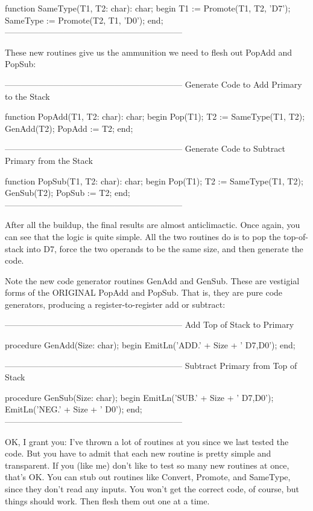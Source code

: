 \documentclass[float=false, crop=false]{standalone}
\begin{document}
function SameType(T1, T2: char): char;
begin
   T1 := Promote(T1, T2, 'D7');
   SameType := Promote(T2, T1, 'D0');
end;
{---------------------------------------------------------------}


These new routines give us the ammunition we need to flesh out PopAdd and
PopSub:


{---------------------------------------------------------------}
{ Generate Code to Add Primary to the Stack }

function PopAdd(T1, T2: char): char;
begin
   Pop(T1);
   T2 := SameType(T1, T2);
   GenAdd(T2);
   PopAdd := T2;
end;


{---------------------------------------------------------------}
{ Generate Code to Subtract Primary from the Stack }

function PopSub(T1, T2: char): char;
begin
   Pop(T1);
   T2 := SameType(T1, T2);
   GenSub(T2);
   PopSub := T2;
end;
{---------------------------------------------------------------}


After all the buildup, the final results are almost anticlimactic. Once again,
you can see that the logic is quite simple. All the two routines do is to pop
the top-of-stack into D7, force the two operands to be the same size, and then
generate the code.

Note the new code generator routines GenAdd and GenSub. These are vestigial
forms of the ORIGINAL PopAdd and PopSub. That is, they are pure code generators,
producing a register-to-register add or subtract:


{---------------------------------------------------------------}
{ Add Top of Stack to Primary }

procedure GenAdd(Size: char);
begin
   EmitLn('ADD.' + Size + ' D7,D0');
end;


{---------------------------------------------------------------}
{ Subtract Primary from Top of Stack }

procedure GenSub(Size: char);
begin
   EmitLn('SUB.' + Size + ' D7,D0');
   EmitLn('NEG.' + Size + ' D0');
end;
{---------------------------------------------------------------}


OK, I grant you: I've thrown a lot of routines at you since we last tested the
code. But you have to admit that each new routine is pretty simple and
transparent. If you (like me) don't like to test so many new routines at once,
that's OK. You can stub out routines like Convert, Promote, and SameType, since
they don't read any inputs. You won't get the correct code, of course, but
things should work. Then flesh them out one at a time.
\end{document}
